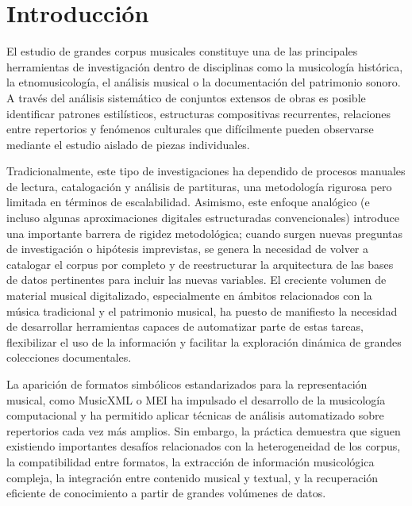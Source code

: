 \chapter{Introducción}
\label{cap:introduccion}


El estudio de grandes corpus musicales constituye una de las principales herramientas de investigación dentro de disciplinas como la musicología histórica, la etnomusicología, el análisis musical o la documentación del patrimonio sonoro. A través del análisis sistemático de conjuntos extensos de obras es posible identificar patrones estilísticos, estructuras compositivas recurrentes, relaciones entre repertorios y fenómenos culturales que difícilmente pueden observarse mediante el estudio aislado de piezas individuales.

Tradicionalmente, este tipo de investigaciones ha dependido de procesos manuales de lectura, catalogación y análisis de partituras, una metodología rigurosa pero limitada en términos de escalabilidad. Asimismo, este enfoque analógico (e incluso algunas aproximaciones digitales estructuradas convencionales) introduce una importante barrera de rigidez metodológica; cuando surgen nuevas preguntas de investigación o hipótesis imprevistas, se genera la necesidad de volver a catalogar el corpus por completo y de reestructurar la arquitectura de las bases de datos pertinentes para incluir las nuevas variables. El creciente volumen de material musical digitalizado, especialmente en ámbitos relacionados con la música tradicional y el patrimonio musical, ha puesto de manifiesto la necesidad de desarrollar herramientas capaces de automatizar parte de estas tareas, flexibilizar el uso de la información y facilitar la exploración dinámica de grandes colecciones documentales.

La aparición de formatos simbólicos estandarizados para la representación musical, como MusicXML \citep{good2001musicxml} o MEI \citep{roland2002music} ha impulsado el desarrollo de la musicología computacional y ha permitido aplicar técnicas de análisis automatizado sobre repertorios cada vez más amplios. Sin embargo, la práctica demuestra que siguen existiendo importantes desafíos relacionados con la heterogeneidad de los corpus, la compatibilidad entre formatos, la extracción de información musicológica compleja, la integración entre contenido musical y textual, y la recuperación eficiente de conocimiento a partir de grandes volúmenes de datos.

